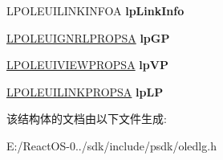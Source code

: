 \begin{DoxyCompactItemize}
L\+P\+O\+L\+E\+U\+I\+L\+I\+N\+K\+I\+N\+F\+OA {\bfseries lp\+Link\+Info}
\item 
\mbox{\label{structtag_o_l_e_u_i_o_b_j_e_c_t_p_r_o_p_s_a_a568a07c6b1537ff7ed8695f5cba4f152}} 
\hyperlink{structtag_o_l_e_u_i_g_n_r_l_p_r_o_p_s_a}{L\+P\+O\+L\+E\+U\+I\+G\+N\+R\+L\+P\+R\+O\+P\+SA} {\bfseries lp\+GP}
\item 
\mbox{\label{structtag_o_l_e_u_i_o_b_j_e_c_t_p_r_o_p_s_a_a7de6e5fc9baeeb4699c7775604f18aec}} 
\hyperlink{structtag_o_l_e_u_i_v_i_e_w_p_r_o_p_s_a}{L\+P\+O\+L\+E\+U\+I\+V\+I\+E\+W\+P\+R\+O\+P\+SA} {\bfseries lp\+VP}
\item 
\mbox{\label{structtag_o_l_e_u_i_o_b_j_e_c_t_p_r_o_p_s_a_a65be2c0e1e3b6419350a42b8735576fd}} 
\hyperlink{structtag_o_l_e_u_i_l_i_n_k_p_r_o_p_s_a}{L\+P\+O\+L\+E\+U\+I\+L\+I\+N\+K\+P\+R\+O\+P\+SA} {\bfseries lp\+LP}
\end{DoxyCompactItemize}


该结构体的文档由以下文件生成\+:\begin{DoxyCompactItemize}
\item 
E\+:/\+React\+O\+S-\/0../sdk/include/psdk/oledlg.\+h\end{DoxyCompactItemize}
